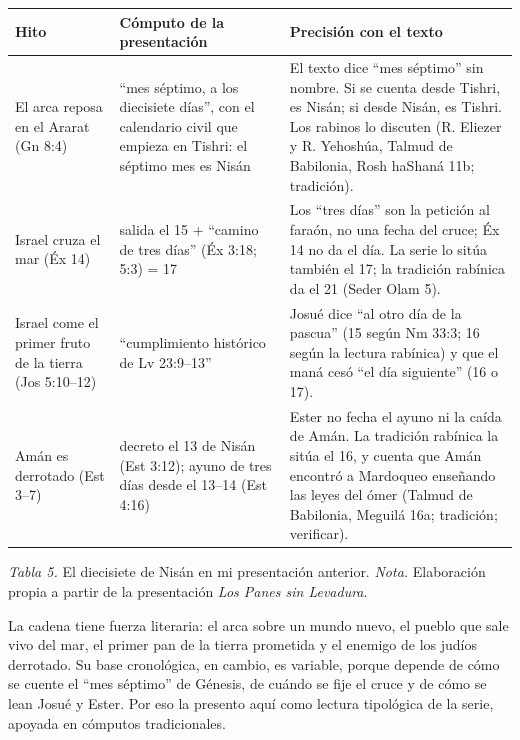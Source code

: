 \documentclass[11pt,letterpaper]{article}
\begin{document}
\begin{center}\begin{minipage}{\linewidth}\centering\footnotesize\renewcommand{\arraystretch}{1.15}
\begin{tabular}{@{}L{3.0cm}L{4.4cm}L{7.0cm}@{}}
\toprule
\textbf{Hito} & \textbf{Cómputo de la presentación} & \textbf{Precisión con el texto} \\ \midrule
El arca reposa en el Ararat (Gn 8:4) & ``mes séptimo, a los diecisiete días'', con el calendario civil que empieza en Tishri: el séptimo mes es Nisán & El texto dice ``mes séptimo'' sin nombre. Si se cuenta desde Tishri, es Nisán; si desde Nisán, es Tishri. Los rabinos lo discuten (R. Eliezer y R. Yehoshúa, Talmud de Babilonia, Rosh haShaná 11b; tradición). \\
Israel cruza el mar (Éx 14) & salida el 15 + ``camino de tres días'' (Éx 3:18; 5:3) = 17 & Los ``tres días'' son la petición al faraón, no una fecha del cruce; Éx 14 no da el día. La serie lo sitúa también el 17; la tradición rabínica da el 21 (Seder Olam 5). \\
Israel come el primer fruto de la tierra (Jos 5:10--12) & ``cumplimiento histórico de Lv 23:9--13'' & Josué dice ``al otro día de la pascua'' (15 según Nm 33:3; 16 según la lectura rabínica) y que el maná cesó ``el día siguiente'' (16 o 17). \\
Amán es derrotado (Est 3--7) & decreto el 13 de Nisán (Est 3:12); ayuno de tres días desde el 13--14 (Est 4:16) & Ester no fecha el ayuno ni la caída de Amán. La tradición rabínica la sitúa el 16, y cuenta que Amán encontró a Mardoqueo enseñando las leyes del ómer (Talmud de Babilonia, Meguilá 16a; tradición; verificar). \\
\bottomrule
\end{tabular}\par
{\footnotesize\color{sepia}\textit{Tabla 5.} El diecisiete de Nisán en mi presentación anterior. \textit{Nota.} Elaboración propia a partir de la presentación \emph{Los Panes sin Levadura}.}
\end{minipage}\end{center}

La cadena tiene fuerza literaria: el arca sobre un mundo nuevo, el pueblo que sale vivo del mar, el primer pan de la tierra prometida y el enemigo de los judíos derrotado. Su base cronológica, en cambio, es variable, porque depende de cómo se cuente el ``mes séptimo'' de Génesis, de cuándo se fije el cruce y de cómo se lean Josué y Ester. Por eso la presento aquí como lectura tipológica de la serie, apoyada en cómputos tradicionales.
\end{document}
